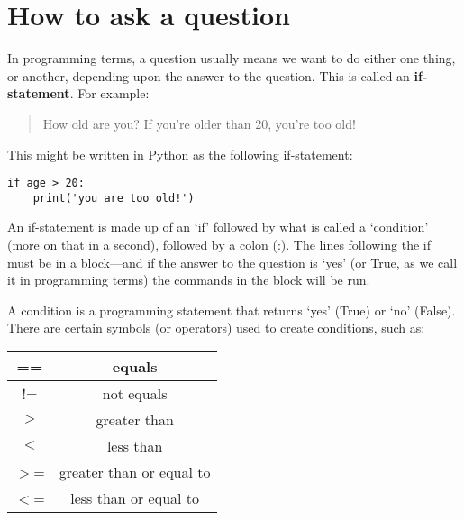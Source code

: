 

\chapter{How to ask a question}\label{ch:howtoaskaquestion}

In programming terms, a question usually means we want to do either one thing, or another, depending upon the answer to the question.  This is called an \textbf{if-statement}.  For example:

\begin{quotation}
How old are you?  If you're older than 20, you're too old!
\end{quotation}

This might be written in Python as the following if-statement:

\begin{listing}
\begin{verbatim}
if age > 20:
    print('you are too old!')
\end{verbatim}
\end{listing}

An if-statement is made up of an `if' followed by what is called a `condition' (more on that in a second), followed by a colon (:).  The lines following the if must be in a block---and if the answer to the question is `yes' (or True, as we call it in programming terms) the commands in the block will be run.
\par
A condition is a programming statement that returns `yes' (True) or `no' (False).  There are certain symbols (or operators) used to create conditions, such as:

\begin{center}
\begin{tabular}{|c|c|}
\hline
== & equals \\
\hline
!= & not equals \\
\hline
$>$ & greater than \\
\hline
$<$ & less than \\
\hline
$>$= & greater than or equal to \\
\hline
$<$= & less than or equal to \\
\hline
\end{tabular}
\end{center}

